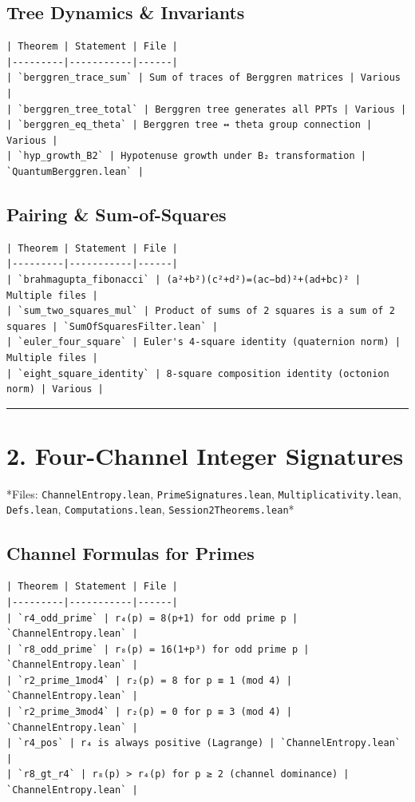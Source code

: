 \documentclass[12pt,a4paper,openany]{book}
\begin{document}
\subsection{Tree Dynamics \& Invariants}
\begin{verbatim}
| Theorem | Statement | File |
|---------|-----------|------|
| `berggren_trace_sum` | Sum of traces of Berggren matrices | Various |
| `berggren_tree_total` | Berggren tree generates all PPTs | Various |
| `berggren_eq_theta` | Berggren tree ↔ theta group connection | Various |
| `hyp_growth_B2` | Hypotenuse growth under B₂ transformation | `QuantumBerggren.lean` |
\end{verbatim}

\subsection{Pairing \& Sum-of-Squares}
\begin{verbatim}
| Theorem | Statement | File |
|---------|-----------|------|
| `brahmagupta_fibonacci` | (a²+b²)(c²+d²)=(ac−bd)²+(ad+bc)² | Multiple files |
| `sum_two_squares_mul` | Product of sums of 2 squares is a sum of 2 squares | `SumOfSquaresFilter.lean` |
| `euler_four_square` | Euler's 4-square identity (quaternion norm) | Multiple files |
| `eight_square_identity` | 8-square composition identity (octonion norm) | Various |
\end{verbatim}

\bigskip\hrule\bigskip

\section{2. Four-Channel Integer Signatures}

*Files: \texttt{ChannelEntropy.lean}, \texttt{PrimeSignatures.lean}, \texttt{Multiplicativity.lean}, \texttt{Defs.lean}, \texttt{Computations.lean}, \texttt{Session2Theorems.lean}*

\subsection{Channel Formulas for Primes}
\begin{verbatim}
| Theorem | Statement | File |
|---------|-----------|------|
| `r4_odd_prime` | r₄(p) = 8(p+1) for odd prime p | `ChannelEntropy.lean` |
| `r8_odd_prime` | r₈(p) = 16(1+p³) for odd prime p | `ChannelEntropy.lean` |
| `r2_prime_1mod4` | r₂(p) = 8 for p ≡ 1 (mod 4) | `ChannelEntropy.lean` |
| `r2_prime_3mod4` | r₂(p) = 0 for p ≡ 3 (mod 4) | `ChannelEntropy.lean` |
| `r4_pos` | r₄ is always positive (Lagrange) | `ChannelEntropy.lean` |
| `r8_gt_r4` | r₈(p) > r₄(p) for p ≥ 2 (channel dominance) | `ChannelEntropy.lean` |
\end{verbatim}
\end{document}
